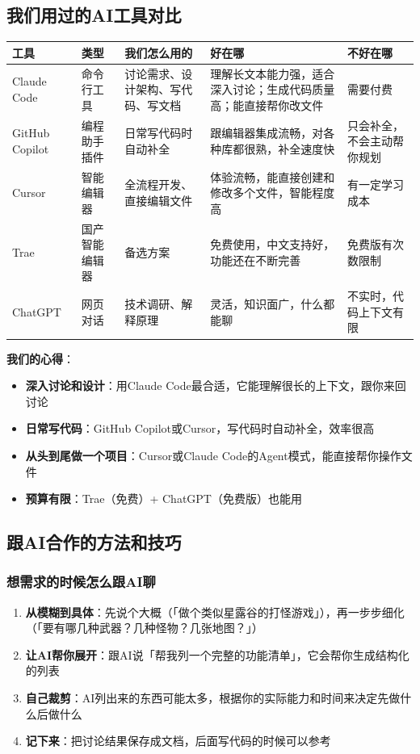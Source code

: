\documentclass[12pt,a4paper]{article}
\begin{document}
\subsection{我们用过的AI工具对比}

\begin{longtable}{p{2cm}p{1.8cm}p{3cm}p{3.5cm}p{3cm}}
\toprule
\textbf{工具} & \textbf{类型} & \textbf{我们怎么用的} & \textbf{好在哪} & \textbf{不好在哪} \\
\midrule
\endhead
Claude Code & 命令行工具 & 讨论需求、设计架构、写代码、写文档 & 理解长文本能力强，适合深入讨论；生成代码质量高；能直接帮你改文件 & 需要付费 \\
GitHub Copilot & 编程助手插件 & 日常写代码时自动补全 & 跟编辑器集成流畅，对各种库都很熟，补全速度快 & 只会补全，不会主动帮你规划 \\
Cursor & 智能编辑器 & 全流程开发、直接编辑文件 & 体验流畅，能直接创建和修改多个文件，智能程度高 & 有一定学习成本 \\
Trae & 国产智能编辑器 & 备选方案 & 免费使用，中文支持好，功能还在不断完善 & 免费版有次数限制 \\
ChatGPT & 网页对话 & 技术调研、解释原理 & 灵活，知识面广，什么都能聊 & 不实时，代码上下文有限 \\
\bottomrule
\end{longtable}

\textbf{我们的心得}：
\begin{itemize}[leftmargin=2em]
    \item \textbf{深入讨论和设计}：用Claude Code最合适，它能理解很长的上下文，跟你来回讨论
    \item \textbf{日常写代码}：GitHub Copilot或Cursor，写代码时自动补全，效率很高
    \item \textbf{从头到尾做一个项目}：Cursor或Claude Code的Agent模式，能直接帮你操作文件
    \item \textbf{预算有限}：Trae（免费）+ ChatGPT（免费版）也能用
\end{itemize}

\subsection{跟AI合作的方法和技巧}

\subsubsection{想需求的时候怎么跟AI聊}

\begin{enumerate}[leftmargin=2em]
    \item \textbf{从模糊到具体}：先说个大概（「做个类似星露谷的打怪游戏」），再一步步细化（「要有哪几种武器？几种怪物？几张地图？」）
    \item \textbf{让AI帮你展开}：跟AI说「帮我列一个完整的功能清单」，它会帮你生成结构化的列表
    \item \textbf{自己裁剪}：AI列出来的东西可能太多，根据你的实际能力和时间来决定先做什么后做什么
    \item \textbf{记下来}：把讨论结果保存成文档，后面写代码的时候可以参考
\end{enumerate}
\end{document}
